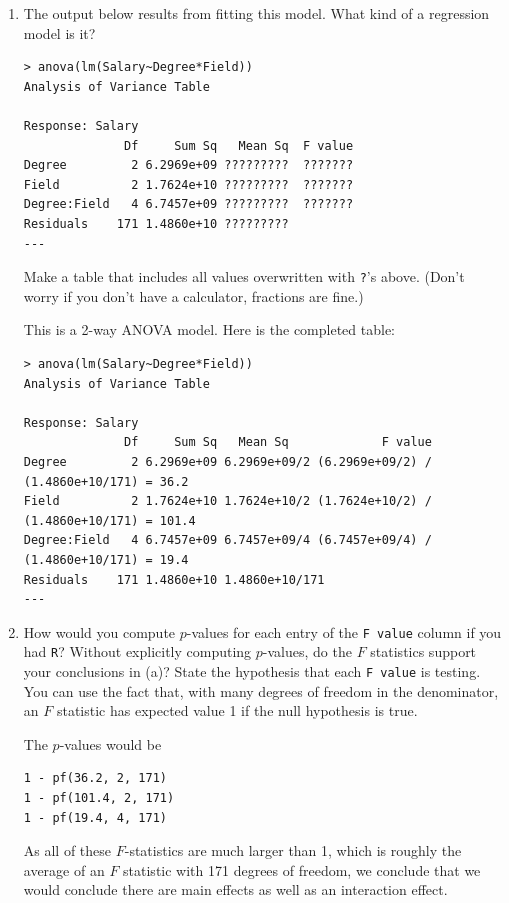 \documentclass{article}
\begin{document}
\begin{enumerate}
\begin{enumerate}
\newpage

\item The output below results from fitting this model. What kind of a regression model is it?
\begin{verbatim}
> anova(lm(Salary~Degree*Field))
Analysis of Variance Table

Response: Salary
              Df     Sum Sq   Mean Sq  F value
Degree         2 6.2969e+09 ?????????  ???????
Field          2 1.7624e+10 ?????????  ???????
Degree:Field   4 6.7457e+09 ?????????  ???????
Residuals    171 1.4860e+10 ?????????
---

\end{verbatim}
Make a table that includes all values overwritten with {\tt ?}'s above.
({\sc Don't worry if you don't have a calculator, fractions are fine.}) 

{\color{red}
This is a 2-way ANOVA model.
Here is the completed table:

\begin{verbatim}
> anova(lm(Salary~Degree*Field))
Analysis of Variance Table

Response: Salary
              Df     Sum Sq   Mean Sq             F value
Degree         2 6.2969e+09 6.2969e+09/2 (6.2969e+09/2) / (1.4860e+10/171) = 36.2
Field          2 1.7624e+10 1.7624e+10/2 (1.7624e+10/2) / (1.4860e+10/171) = 101.4
Degree:Field   4 6.7457e+09 6.7457e+09/4 (6.7457e+09/4) / (1.4860e+10/171) = 19.4
Residuals    171 1.4860e+10 1.4860e+10/171 
---

\end{verbatim}

}

\newpage 
\item How would you compute $p$-values for each entry of the {\tt F value} column if you had {\tt R}? Without explicitly computing $p$-values, do the $F$ statistics support your conclusions in (a)? State the hypothesis that each {\tt F value} is testing. {\sc You can use the fact that, with many degrees of freedom in the denominator, an $F$ statistic has expected value 1 if the null hypothesis is true.}

{\color{red}
The $p$-values would be
\begin{verbatim}
1 - pf(36.2, 2, 171)
1 - pf(101.4, 2, 171)
1 - pf(19.4, 4, 171)
\end{verbatim}

As all of these $F$-statistics are much larger than 1, which is roughly the average of an $F$ statistic with 171 degrees of freedom, we conclude that we would conclude there are main effects as well
as an interaction effect.
}



\end{enumerate}
\end{enumerate}
\end{document}
